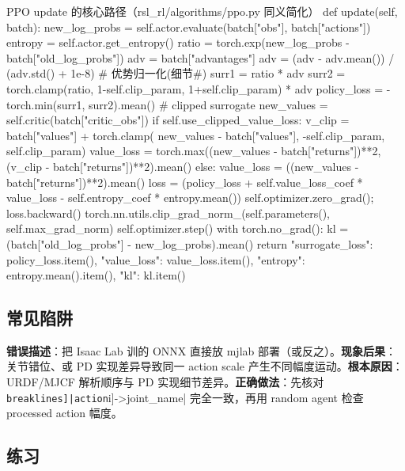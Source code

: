 \begin{codebox}[Python]{PPO update 的核心路径（rsl\_rl/algorithms/ppo.py 同义简化）}
def update(self, batch):
    new_log_probs = self.actor.evaluate(batch["obs"], batch["actions"])
    entropy = self.actor.get_entropy()
    ratio = torch.exp(new_log_probs - batch["old_log_probs"])
    adv = batch["advantages"]
    adv = (adv - adv.mean()) / (adv.std() + 1e-8)         # 优势归一化(细节#)
    surr1 = ratio * adv
    surr2 = torch.clamp(ratio, 1-self.clip_param, 1+self.clip_param) * adv
    policy_loss = -torch.min(surr1, surr2).mean()         # clipped surrogate
    new_values = self.critic(batch["critic_obs"])
    if self.use_clipped_value_loss:
        v_clip = batch["values"] + torch.clamp(
            new_values - batch["values"], -self.clip_param, self.clip_param)
        value_loss = torch.max((new_values - batch["returns"])**2,
                               (v_clip - batch["returns"])**2).mean()
    else:
        value_loss = ((new_values - batch["returns"])**2).mean()
    loss = (policy_loss + self.value_loss_coef * value_loss
            - self.entropy_coef * entropy.mean())
    self.optimizer.zero_grad(); loss.backward()
    torch.nn.utils.clip_grad_norm_(self.parameters(), self.max_grad_norm)
    self.optimizer.step()
    with torch.no_grad():
        kl = (batch["old_log_probs"] - new_log_probs).mean()
    return {"surrogate_loss": policy_loss.item(), "value_loss": value_loss.item(),
            "entropy": entropy.mean().item(), "kl": kl.item()}
\end{codebox}

\subsection{常见陷阱}

\begin{pitfall}
\textbf{错误描述}：把 Isaac Lab 训的 ONNX 直接放 mjlab 部署（或反之）。\textbf{现象后果}：关节错位、或 PD 实现差异导致同一 action scale 产生不同幅度运动。\textbf{根本原因}：URDF/MJCF 解析顺序与 PD 实现细节差异。\textbf{正确做法}：先核对 \Verb[breaklines]|action[i]->joint_name| 完全一致，再用 random agent 检查 processed action 幅度。
\end{pitfall}

\subsection{练习}

